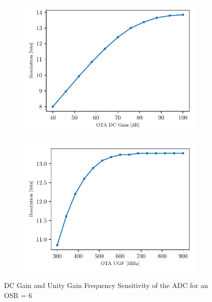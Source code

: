 \begin{figure}[htp]
	\centering
	\begin{subfigure}[b]{0.48\textwidth}
		\centering
		\includegraphics[width=\textwidth]{Chapter4/Figs/results/adc/adc_OSR6_ota_dc_gain_800MHz.pdf}
		\label{fig:adc-osr6-gain}
	\end{subfigure}
	\begin{subfigure}[b]{0.48\textwidth}
		\centering
		\includegraphics[width=\textwidth]{Chapter4/Figs/results/adc/adc_OSR6_ota_ugf_80dB.pdf}
		\label{fig:adc-osr6-ugf}
	\end{subfigure}
	\caption{DC Gain and Unity Gain Frequency Sensitivity of the ADC for an OSR = 6}
	\label{fig:adc-osr6-sensitivity}
\end{figure}

